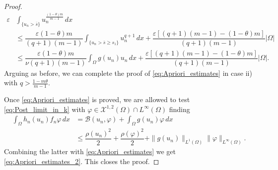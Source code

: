 \documentclass[11pt,a4paper]{amsart}
\theoremstyle{definition}
\theoremstyle{plain}
\numberwithin{equation}{section}
\begin{document}
{\begin{proof}
\begin{equation}
  \begin{aligned}
  \varepsilon & \int_{\{u_n > \overline{s}\}}u_{n}^{\tfrac{(1-\theta)m}{m-1}}\,dx \\
  &\leq \dfrac{\varepsilon (1-\theta)m}{(q+1)(m-1)} \int_{\{u_n>\overline{s}\geq s_1\}}u_{n}^{q+1}\,dx + \dfrac{\varepsilon[(q+1)(m-1)-(1-\theta)m]}{(q+1)(m-1)}|\Omega|\\
  &\leq \dfrac{\varepsilon (1-\theta)m}{\nu (q+1)(m-1)} \int_{\Omega}g(u_{n})u_n\,dx + \dfrac{\varepsilon[(q+1)(m-1)-(1-\theta)m]}{(q+1)(m-1)}|\Omega|.
  \end{aligned}
  \end{equation}
  \noindent Arguing as before, we can complete the proof of \eqref{eq:Apriori_estimates} in case {\rm ii)} with $q >\tfrac{1-m\theta}{m-1}$. 
 \medskip
 
  Once \eqref{eq:Apriori_estimates} is proved, we are allowed to test \eqref{eq:Post_limit_in_k} with $\varphi \in \mathcal{X}^{1,2}(\Omega)\cap L^{\infty}(\Omega)$  finding
  \begin{equation*}
  \begin{aligned}
  \int_{\Omega}h_n(u_n)f_n \varphi\,dx &= \mathcal{B}(u_n,\varphi) +\int_{\Omega}g(u_n)\varphi\,dx \\
  &\leq \dfrac{\rho(u_n)^2}{2} + \dfrac{\rho(\varphi)^2}{2}+ \|g(u_n)\|_{L^{1}(\Omega)} \|\varphi\|_{L^{\infty}(\Omega)}.
    \end{aligned}
  \end{equation*}
    Combining the latter with \eqref{eq:Apriori_estimates} we get \eqref{eq:Apriori_estimates_2}. This closes the proof. 
  \end{proof}
  
}
\end{document}

